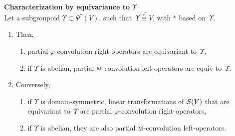 \begin{proposition}\textbf{Characterization by equivariance to $\Upsilon$}\\
Let a subgroupoid $\Upsilon \subset \Psi^*(V)$, such that~$\Upsilon \overset\varphi\equiv V$, with $\ast$ based on~$\Upsilon$.
\begin{enumerate}
\item Then,
\begin{enumerate}[label=(\roman*)]
  \item partial $\varphi$-convolution right-operators are equivariant to~$\Upsilon$,\label{enum:i}
  \item if $\Upsilon$ is abelian, partial $\operatorname{\textsc{m}}$-convolution left-operators are equiv to~$\Upsilon$.\label{enum:ii}
\end{enumerate}
\item Conversely, \label{enum:2}
\begin{enumerate}[label=(\roman*)]
  \item if $\Upsilon$ is domain-symmetric, linear transformations of $\mathcal{S}(V)$ that are equivariant to~$\Upsilon$ are partial $\varphi$-convolution right-operators,
  \item if $\Upsilon$ is abelian, they are also partial $\operatorname{\textsc{m}}$-convolution left-operators.
\end{enumerate}
\end{enumerate}
\label{prop:equiP}
\end{proposition}
